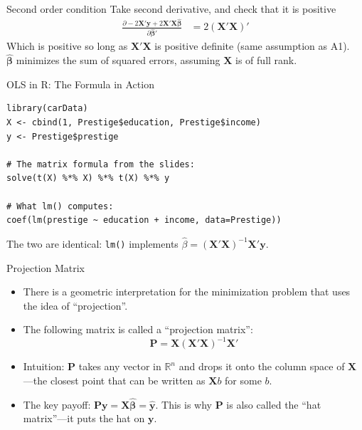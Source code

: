 \documentclass[aspectratio=169, handout]{beamer}
\numberwithin{equation}{section}
\begin{document}
\begin{frame}{Second order condition}
Take second derivative, and check that it is positive
\begin{align*}
\frac{\partial -2\bm{X}'\bm{y}+2\bm{X}'\bm{X}\bm{\hat{\beta}}}{\partial \bm{\hat{\beta}'}}&=2(\bm{X}'\bm{X})'
\end{align*}
Which is positive so long as $\bm{X}'\bm{X}$ is positive definite (same assumption as A1).\\
$\bm{\hat{\beta}}$ minimizes the sum of squared errors, assuming $\bm{X}$ is of full rank.
\end{frame}

\begin{frame}[fragile]{OLS in R: The Formula in Action}
\begin{lstlisting}
library(carData)
X <- cbind(1, Prestige$education, Prestige$income)
y <- Prestige$prestige

# The matrix formula from the slides:
solve(t(X) %*% X) %*% t(X) %*% y

# What lm() computes:
coef(lm(prestige ~ education + income, data=Prestige))
\end{lstlisting}
\vspace{1ex}
The two are identical: \texttt{lm()} implements $\hat{\beta}=(\bm{X'X})^{-1}\bm{X'y}$.
\end{frame}

\begin{frame}{Projection Matrix}
\begin{itemize}
\item There is a geometric interpretation for the minimization problem that uses the idea of ``projection''.
\item The following matrix is called a ``projection matrix'':
$$\bm{P}=\bm{X}(\bm{X}'\bm{X})^{-1}\bm{X}'$$
\item Intuition: $\bm{P}$ takes any vector in $\mathbb{R}^n$ and drops it onto the column space of $\bm{X}$---the closest point that can be written as $\bm{X}b$ for some $b$.\pause
\item The key payoff: $\bm{P}\bm{y}=\bm{X}\bm{\hat{\beta}}=\bm{\hat{y}}$. This is why $\bm{P}$ is also called the ``hat matrix''---it puts the hat on $\bm{y}$.
\end{itemize}
\end{frame}
\end{document}
